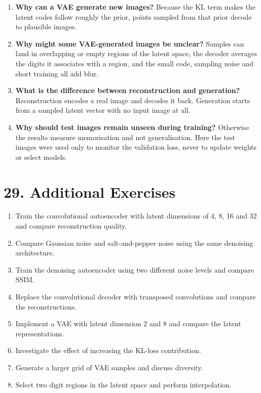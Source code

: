 \documentclass[10pt]{article}
\begin{document}
\begin{enumerate}
continuous. Smoothly changing decoded images along a line between two codes show that
the decoder maps nearby points to similar images.
\item \textbf{Why can a VAE generate new images?} Because the KL term makes the latent
codes follow roughly the prior, points sampled from that prior decode to plausible images.
\item \textbf{Why might some VAE-generated images be unclear?} Samples can land in
overlapping or empty regions of the latent space, the decoder averages the digits it associates
with a region, and the small code, sampling noise and short training all add blur.
\item \textbf{What is the difference between reconstruction and generation?} Reconstruction encodes
a real image and decodes it back. Generation starts from a sampled latent vector with no input
image at all.
\item \textbf{Why should test images remain unseen during training?} Otherwise the results measure memorisation and not generalisation. Here the test images were used only to monitor the validation loss, never to update weights or select models.
\end{enumerate}

\section*{29. Additional Exercises}

\begin{enumerate}
\item Train the convolutional autoencoder with latent dimensions of 4, 8, 16
and 32 and compare reconstruction quality.
\item Compare Gaussian noise and salt-and-pepper noise using the same denoising
architecture.
\item Train the denoising autoencoder using two different noise levels and
compare SSIM.
\item Replace the convolutional decoder with transposed convolutions and
compare the reconstructions.
\item Implement a VAE with latent dimension 2 and 8 and compare the latent
representations.
\item Investigate the effect of increasing the KL-loss contribution.
\item Generate a larger grid of VAE samples and discuss diversity.
\item Select two digit regions in the latent space and perform interpolation.
\end{enumerate}
\end{document}

